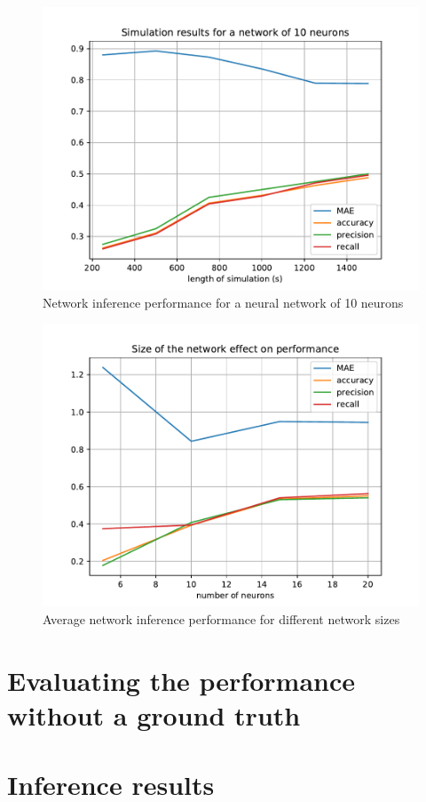 \begin{figure}
	\centering
	\includegraphics[width=0.8\linewidth]{results_10_neurons.pdf}
	\caption{Network inference performance for a neural network of 10 neurons}
	\label{fig:results_10_neurons}
\end{figure}




\begin{figure}
	\centering
	\includegraphics[width=0.8\linewidth]{size_effect_performance.pdf}
	\caption{Average network inference performance for different network sizes}
	\label{fig:results_network_sizes}
\end{figure}

\section{Evaluating the performance without a ground truth}
\section{Inference results}

